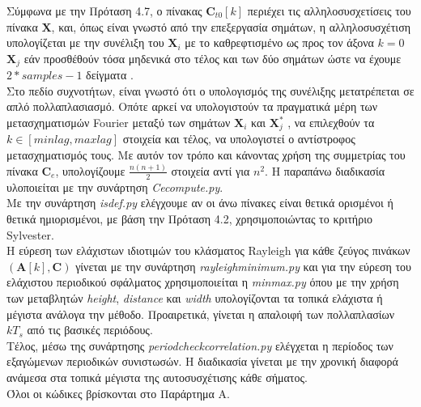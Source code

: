 \newpage
\noindent Σύμφωνα με την Πρόταση 4.7, ο πίνακας \en $\mathbf{C}_{t0}[k]$ \gr περιέχει τις αλληλοσυσχετίσεις του πίνακα \en $\mathbf{X}$, \gr και, όπως είναι γνωστό από την επεξεργασία σημάτων, η αλληλοσυσχέτιση υπολογίζεται με την συνέλιξη του \en $\mathbf{X}_{i}$ \gr με το καθρεφτισμένο ως προς τον άξονα \en $k=0$ \gr \en $\mathbf{X}_{j}$ \gr εάν προσθέθούν τόσα μηδενικά στο τέλος και των δύο σημάτων ώστε να έχουμε \en $2*samples-1$ \gr δείγματα \cite{signals:27}. 
\\[0.5 \baselineskip]
Στο πεδίο συχνοτήτων, είναι γνωστό ότι ο υπολογισμός της συνέλιξης μετατρέπεται σε απλό πολλαπλασιασμό. Οπότε αρκεί να υπολογιστούν τα πραγματικά μέρη των μετασχηματισμών \en Fourier \gr μεταξύ των σημάτων \en $\mathbf{X}_{i}$ \gr και \en $\mathbf{X}_{j}^{*}$ \gr, να επιλεχθούν τα $ k \in [minlag,maxlag]$ στοιχεία και τέλος, να υπολογιστεί ο αντίστροφος μετασχηματισμός τους. Με αυτόν τον τρόπο και κάνοντας χρήση της συμμετρίας του πίνακα \en $\mathbf{C}_e$, \gr υπολογίζουμε \en $\frac{n(n+1)}{2}$ \gr στοιχεία αντί για \en $n^2$. \gr Η παραπάνω διαδικασία υλοποιείται με την συνάρτηση \en \emph{Ce\textunderscore compute.py}. \gr
\\[0.5 \baselineskip]
Με την συνάρτηση \en \emph{is\textunderscore def.py} \gr ελέγχουμε αν οι άνω πίνακες είναι θετικά ορισμένοι ή θετικά ημιορισμένοι, με βάση την Πρόταση 4.2, χρησιμοποιώντας το κριτήριο \en Sylvester. \gr
\\[0.5 \baselineskip]
Η εύρεση των ελάχιστων ιδιοτιμών του κλάσματος \en Rayleigh \gr για κάθε ζεύγος πινάκων \en $\left( \mathbf{A}[k],\mathbf{C} \right)$ \gr
γίνεται με την συνάρτηση \en \emph{rayleigh\textunderscore minimum.py} \gr και για την εύρεση του ελάχιστου περιοδικού σφάλματος χρησιμοποιείται η \en\emph{min\textunderscore max.py} \gr όπου με την χρήση των μεταβλητών \en \emph{height}, \emph{distance} \gr και \en \emph{width} \gr υπολογίζονται τα τοπικά ελάχιστα ή μέγιστα ανάλογα την μέθοδο. Προαιρετικά, γίνεται η απαλοιφή των πολλαπλασίων \en $k T_s$ \gr από τις βασικές περιόδους.
\\[0.5 \baselineskip]
Τέλος, μέσω της συνάρτησης \en \emph{period\textunderscore check\textunderscore correlation.py} \gr ελέγχεται η περίοδος των εξαγώμενων περιοδικών συνιστωσών. Η διαδικασία γίνεται με την χρονική διαφορά ανάμεσα στα τοπικά μέγιστα της αυτοσυσχέτισης κάθε σήματος.
\\[0.5 \baselineskip]
Όλοι οι κώδικες βρίσκονται στο Παράρτημα Α.


